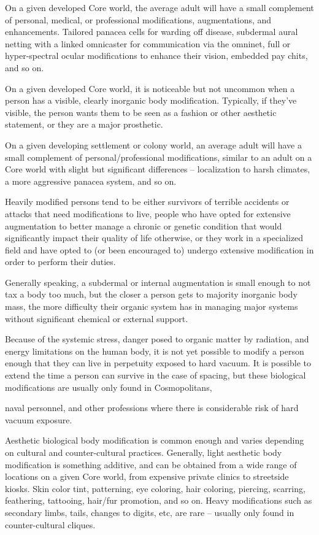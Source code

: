 On a given developed Core world, the average adult will have a small complement of personal,
medical, or professional modifications, augmentations, and enhancements. Tailored panacea
cells for warding off disease, subdermal aural netting with a linked omnicaster for communication
via the omninet, full or hyper-spectral ocular modifications to enhance their vision, embedded
pay chits, and so on.


On a given developed Core world, it is noticeable but not uncommon when a person has a
visible, clearly inorganic body modification. Typically, if they’ve visible, the person wants them to
be seen as a fashion or other aesthetic statement, or they are a major prosthetic.



On a given developing settlement or colony world, an average adult will have a small
complement of personal/professional modifications, similar to an adult on a Core world with
slight but significant differences -- localization to harsh climates, a more aggressive panacea
system, and so on.


Heavily modified persons tend to be either survivors of terrible accidents or attacks that need
modifications to live, people who have opted for extensive augmentation to better manage a
chronic or genetic condition that would significantly impact their quality of life otherwise, or they
work in a specialized field and have opted to (or been encouraged to) undergo extensive
modification in order to perform their duties.


Generally speaking, a subdermal or internal augmentation is small enough to not tax a body too
much, but the closer a person gets to majority inorganic body mass, the more difficulty their
organic system has in managing major systems without significant chemical or external support.


Because of the systemic stress, danger posed to organic matter by radiation, and energy
limitations on the human body, it is not yet possible to modify a person enough that they can live
in perpetuity exposed to hard vacuum. It is possible to extend the time a person can survive in
the case of spacing, but these biological modifications are usually only found in Cosmopolitans,




naval personnel, and other professions where there is considerable risk of hard vacuum
exposure.


Aesthetic biological body modification is common enough and varies depending on cultural and
counter-cultural practices. Generally, light aesthetic body modification is something additive, and
can be obtained from a wide range of locations on a given Core world, from expensive private
clinics to streetside kiosks. Skin color tint, patterning, eye coloring, hair coloring, piercing,
scarring, feathering, tattooing, hair/fur promotion, and so on. Heavy modifications such as
secondary limbs, tails, changes to digits, etc, are rare -- usually only found in counter-cultural
cliques.


